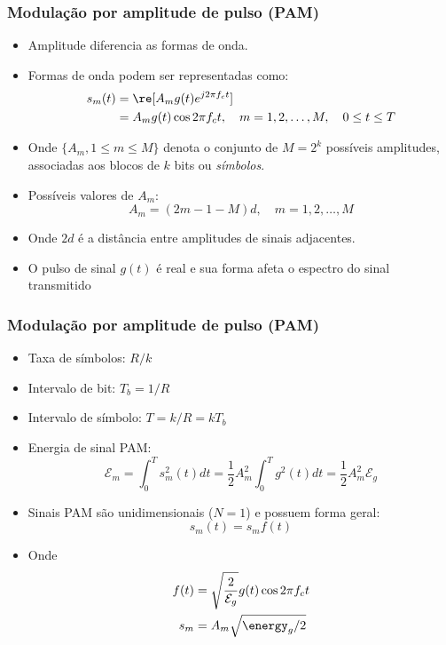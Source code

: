 \begin{frame}
	\frametitle{Modulação por amplitude de pulso (PAM)}

	
	   \begin{itemize}
	    \item Amplitude diferencia as formas de onda.
	    \item Formas de onda podem ser representadas como:
	    \begin{align*}
		  s_m(t) &= \re[A_m g(t) e^{j2\pi f_c t}] \\
		  &= A_m g(t) \cos 2\pi f_c t , \quad m=1,2,\ldots, M, \quad 0 \leq t \leq T
	    \end{align*}
	    \item Onde $\{A_m, 1 \leq m \leq M \}$ denota o conjunto de $M=2^k$ possíveis amplitudes, associadas aos blocos de $k$ bits ou \textit{símbolos}.
	    \item Possíveis valores de $A_m$:
	    \begin{equation*}
		A_m = (2m-1-M)d, \quad m=1,2,\ldots,M
	    \end{equation*}
	      \item Onde $2d$ é a distância entre amplitudes de sinais adjacentes.
	      \item O pulso de sinal $g(t)$ é real e sua forma afeta o espectro do sinal transmitido
	   \end{itemize}
	

\end{frame}

\begin{frame}
	\frametitle{Modulação por amplitude de pulso (PAM)}

	\begin{itemize}
	  \item Taxa de símbolos: $R/k$
	  \item Intervalo de bit: $T_b = 1/R$
	  \item Intervalo de símbolo: $T = k/R = kT_b$
	  \item Energia de sinal PAM:
	  \begin{equation*}
	      \mathcal{E}_m = \int_0^T s_m^2(t) dt = \frac{1}{2}A_m^2\int_0^T g^2(t) dt = \frac{1}{2}A_m^2 \mathcal{E}_g
	  \end{equation*}
	   \item Sinais PAM são unidimensionais ($N=1$) e possuem forma geral:
	  \begin{equation*}
	      s_m(t) = s_m f(t)
	  \end{equation*}
	  \item Onde
	      \begin{align*}
		  f(t) &= \sqrt{\frac{2}{\mathcal{E}_g}} g(t) \cos 2\pi f_c t \\
		  s_m &= A_m \sqrt{\energy_g / 2}
	      \end{align*}

	\end{itemize}

\end{frame}

